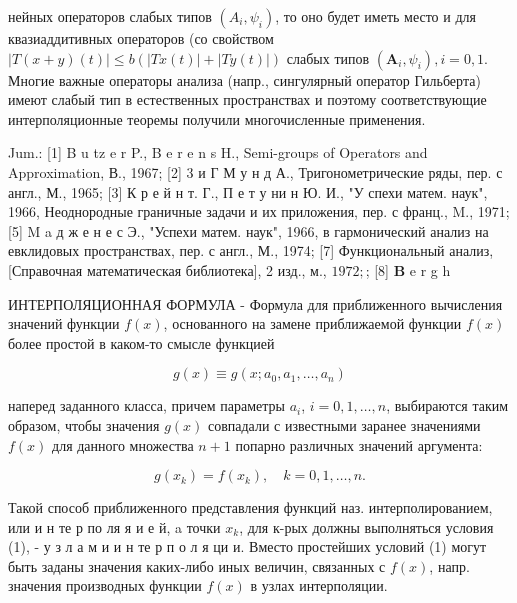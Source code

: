 \documentclass[10pt]{article}
\begin{document}
нейных операторов слабых типов $\left(A_{i}, \psi_{i}\right)$, то оно будет иметь место и для квазиаддитивных операторов (со свойством $|T(x+y)(t)| \leqslant b(|T x(t)|+|T y(t)|)$ слабых типов $\left(\boldsymbol{A}_{i}, \psi_{i}\right), i=0,1$. Многие важные операторы анализа (напр., сингулярный оператор Гильберта) имеют слабый тип в естественных пространствах и поэтому соответствующие интерполяционные теоремы получили многочисленные применения.



Jum.: [1] B u tz e r P., B e r e n s H., Semi-groups of Operators and Approximation, В., 1967; [2] 3 и Г М у н д А., Тригонометрические ряды, пер. с англ., М., 1965; [3] К р е й н т. Г., П е т у ни н Ю. И., "У спехи матем. наук", 1966, Неоднородные граничные задачи и их приложения, пер. с франц., M., 1971; [5] M a д ж е н е с Э., "Успехи матем. наук", 1966, в гармонический анализ на евклидовых пространствах, пер. с англ., М., 1974; [7] Функциональный анализ, [Справочная математическая библиотека], 2 изд., м., $1972 ;$; [8] $\mathbf{B}$ e r g h



ИНТЕРПОЛЯЦИОННАЯ ФОРМУЛА - Формула для приближенного вычисления значений функции $f(x)$, основанного на замене приближаемой функции $f(x)$ более простой в каком-то смысле функцией



\[

g(x) \equiv g\left(x ; a_{0}, a_{1}, \ldots, a_{n}\right)

\]



наперед заданного класса, причем параметры $a_{i}$, $i=0,1, \ldots, n$, выбираются таким образом, чтобы значения $g(x)$ совпадали с известными заранее значениями $f(x)$ для данного множества $n+1$ попарно различных значений аргумента:



\[

g\left(x_{k}\right)=f\left(x_{k}\right), \quad k=0,1, \ldots, n .

\]



Такой способ приближенного представления функций наз. интерполированием, или и н те р по ля я и е й, a точки $x_{k}$, для к-рых должны выполняться условия (1), - у з л а м и и н те р п о л я ци и. Вместо простейших условий (1) могут быть заданы значения каких-либо иных величин, связанных с $f(x)$, напр. значения производных функции $f(x)$ в узлах интерполяции.
\end{document}
